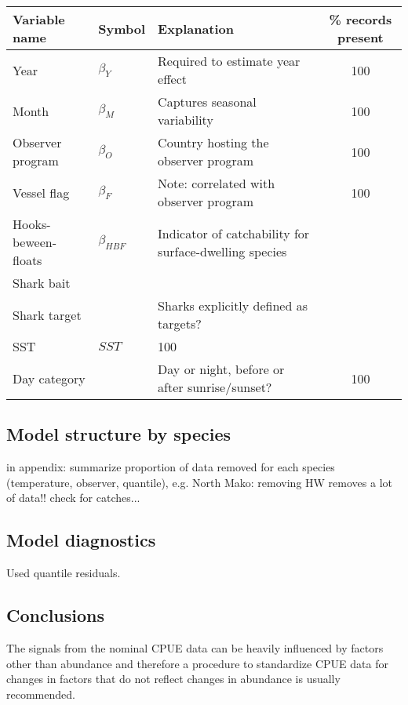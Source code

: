 \begin{table}[!h]
\label{tbl:glm-vars}
\begin{center}
\begin{tabular}{l|l|p{7cm}|c}
Variable name & Symbol & Explanation & \% records present\\
\hline
\hline
Year & $\beta_Y$ & Required to estimate year effect & 100\\
Month & $\beta_M$ & Captures seasonal variability & 100\\
Observer program & $\beta_O$ & Country hosting the observer program & 100\\
Vessel flag & $\beta_F$ & Note: correlated with observer program & 100\\
Hooks-beween-floats& $\beta_{HBF}$ & Indicator of catchability for surface-dwelling species\\
Shark bait &&\\
Shark target&&Sharks explicitly defined as targets?\\
SST & $SST$ & 100\\
Day category && Day or night, before or after sunrise/sunset?&100\\

\end{tabular}
\end{center}
\end{table}

\subsection{Model structure by species}
in appendix: summarize proportion of data removed for each species (temperature, observer, quantile), e.g. North Mako: removing HW removes a lot of data!! check for catches...

\subsection{Model diagnostics}
Used quantile residuals. 

\subsection{Conclusions}
The signals from the nominal  CPUE data can be heavily influenced by factors other than abundance and therefore a procedure to standardize CPUE data for changes in factors  that do not reflect changes in abundance is usually recommended. 

